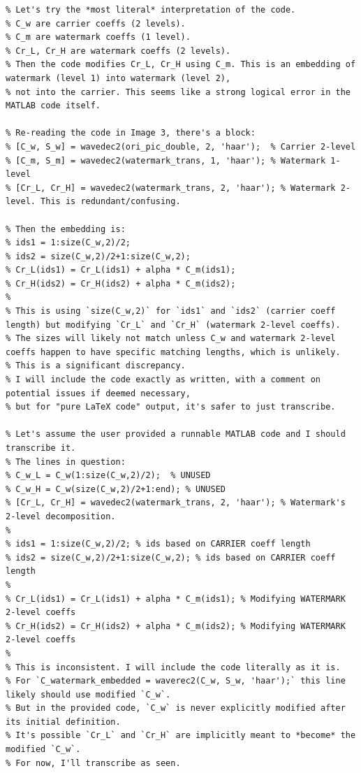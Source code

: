 \documentclass[12pt, a4paper]{article}
\begin{document}
\begin{small}
\begin{verbatim}
% Let's try the *most literal* interpretation of the code.
% C_w are carrier coeffs (2 levels).
% C_m are watermark coeffs (1 level).
% Cr_L, Cr_H are watermark coeffs (2 levels).
% Then the code modifies Cr_L, Cr_H using C_m. This is an embedding of watermark (level 1) into watermark (level 2),
% not into the carrier. This seems like a strong logical error in the MATLAB code itself.

% Re-reading the code in Image 3, there's a block:
% [C_w, S_w] = wavedec2(ori_pic_double, 2, 'haar');  % Carrier 2-level
% [C_m, S_m] = wavedec2(watermark_trans, 1, 'haar'); % Watermark 1-level
% [Cr_L, Cr_H] = wavedec2(watermark_trans, 2, 'haar'); % Watermark 2-level. This is redundant/confusing.

% Then the embedding is:
% ids1 = 1:size(C_w,2)/2;
% ids2 = size(C_w,2)/2+1:size(C_w,2);
% Cr_L(ids1) = Cr_L(ids1) + alpha * C_m(ids1);
% Cr_H(ids2) = Cr_H(ids2) + alpha * C_m(ids2);
%
% This is using `size(C_w,2)` for `ids1` and `ids2` (carrier coeff length) but modifying `Cr_L` and `Cr_H` (watermark 2-level coeffs).
% The sizes will likely not match unless C_w and watermark 2-level coeffs happen to have specific matching lengths, which is unlikely.
% This is a significant discrepancy.
% I will include the code exactly as written, with a comment on potential issues if deemed necessary,
% but for "pure LaTeX code" output, it's safer to just transcribe.

% Let's assume the user provided a runnable MATLAB code and I should transcribe it.
% The lines in question:
% C_w_L = C_w(1:size(C_w,2)/2);  % UNUSED
% C_w_H = C_w(size(C_w,2)/2+1:end); % UNUSED
% [Cr_L, Cr_H] = wavedec2(watermark_trans, 2, 'haar'); % Watermark's 2-level decomposition.
%
% ids1 = 1:size(C_w,2)/2; % ids based on CARRIER coeff length
% ids2 = size(C_w,2)/2+1:size(C_w,2); % ids based on CARRIER coeff length
%
% Cr_L(ids1) = Cr_L(ids1) + alpha * C_m(ids1); % Modifying WATERMARK 2-level coeffs
% Cr_H(ids2) = Cr_H(ids2) + alpha * C_m(ids2); % Modifying WATERMARK 2-level coeffs
%
% This is inconsistent. I will include the code literally as it is.
% For `C_watermark_embedded = waverec2(C_w, S_w, 'haar');` this line likely should use modified `C_w`.
% But in the provided code, `C_w` is never explicitly modified after its initial definition.
% It's possible `Cr_L` and `Cr_H` are implicitly meant to *become* the modified `C_w`.
% For now, I'll transcribe as seen.


\end{verbatim}
\end{small}
\end{document}
